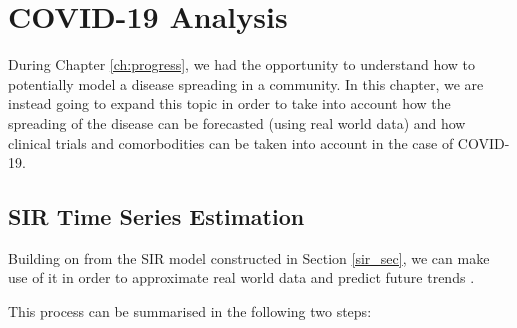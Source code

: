 \chapter{COVID-19 Analysis}
\setcounter{secnumdepth}{5}
\label{ch:AI}
\setlength\lineskip{0pt}
\vspace*{15pt}

 
 
\lstset{style=mystyle}

During Chapter \ref{ch:progress}, we had the opportunity to understand how to potentially model a disease spreading in a community. In this chapter, we are instead going to expand this topic in order to take into account how the spreading of the disease can be forecasted (using real world data) and how clinical trials and comorbodities can be taken into account in the case of COVID-19.

\section{SIR Time Series Estimation}
\label{tool_ref_app}
Building on from the SIR model constructed in Section \ref{sir_sec}, we can make use of it in order to approximate real world data and predict future trends \cite{atom}.

This process can be summarised in the following two steps:

